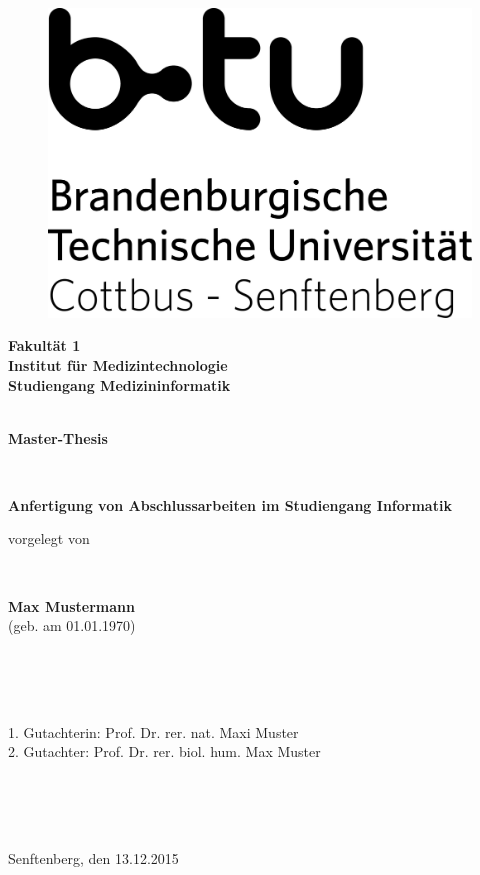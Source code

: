 \begin{titlepage}
	\begin{center}
		\bigskip
		\ \\
	\begin{figure}[ht]
		\center\includegraphics[scale=2]{img/logo}
	\end{figure}
		\vfill
		\Large \textbf{Fakultät 1 \\ Institut für Medizintechnologie \\ Studiengang Medizininformatik}
		\ \\
		\ \\
		\vfill
		{\Huge \textbf{Master-Thesis} \par}	
		\ \\
		\vfill
		{\Large \textbf{Anfertigung von Abschlussarbeiten im Studiengang Informatik}
		\par}
		\vfill
		{\normalsize{vorgelegt von}\par}
		\ \\
		\vfill
		{\Large \textbf{Max Mustermann} \ \\
						\normalsize{(geb. am 01.01.1970)}
		\par}
		\ \\
		
		\ \\
		\ \\
	\end{center}
	\vfill	
	{\normalsize{1. Gutachterin: Prof. Dr. rer. nat. Maxi Muster \ \\
				 2. Gutachter: Prof. Dr. rer. biol. hum. Max Muster}\par}
		\ \\
		\ \\
		\ \\
	{\normalsize{Senftenberg, den 13.12.2015}\par}
\end{titlepage}